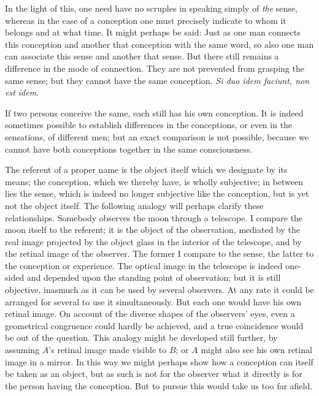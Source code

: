 \documentclass[twoside,12pt]{article}
\begin{document}
In the light of this, one need have no scruples in speaking simply of
\emph{the} sense, whereas in the case of a conception one must
precisely indicate to whom it belongs and at what time. It might
perhaps be said: Just as one man connects this conception and another
that conception with the same word, so also one man can associate this
sense and another that sense. But there still remains a difference in
the mode of connection. They are not prevented from grasping the same
sense;  but they cannot have the same conception. {\it
  Si duo idem faciunt, non est idem}.

If two persons conceive the same, each still has his own conception.
It is indeed sometimes possible to establish differences in the
conceptions, or even in the sensations, of different men; but an exact
comparison is not possible, because we cannot have both conceptions
together in the same consciousness.

The referent of a proper name is the object itself which we designate
by its means; the conception, which we thereby have, is wholly
subjective; in between lies the sense, which is indeed no longer
subjective like the conception, but is yet not the object itself. The
following analogy will perhaps clarify these relationships. Somebody
observes the moon through a telescope. I compare the moon itself to
the referent; it is the object of the observation, mediated by the
real image projected by the object glass in the interior of the
telescope, and by the retinal image of the observer. The former I
compare to the sense, the latter to the conception or experience. The
optical image in the telescope is indeed one-sided and depended upon
the standing point of observation; but it is still objective, inasmuch
as it can be used by several observers. At any rate it could be
arranged for several to use it simultaneously. But each one would have
his own retinal image. On account of the diverse shapes of the
observers' eyes, even a geometrical congruence could hardly be
achieved, and a true coincidence would be out of the question. This
analogy might be developed still further, by assuming $A$'s retinal
image made visible to $B$; or $A$ might also see his own retinal image
in a mirror. In this way we might perhaps show how a conception can
itself be taken as an object, but as such is not for the observer what
it directly is for the person having the conception. But to pursue
this would take us too far afield.
\end{document}
